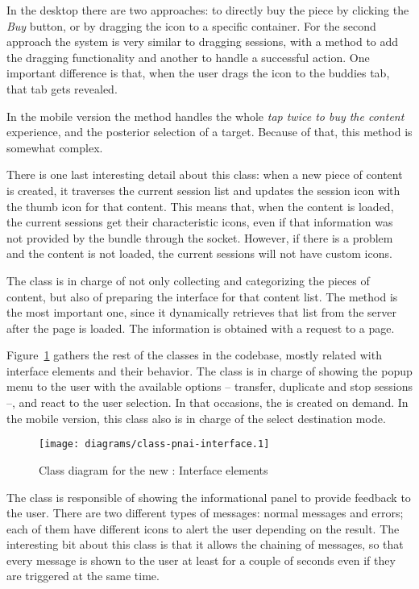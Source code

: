 In the desktop there are two approaches: to directly buy the piece by clicking the \emph{Buy} button, or by dragging the icon to a specific container.
For the second approach the system is very similar to dragging sessions, with a method to add the dragging functionality and another to handle a successful action.
One important difference is that, when the user drags the icon to the buddies tab, that tab gets revealed.

In the mobile version the  method handles the whole \emph{tap twice to buy the content} experience, and the posterior selection of a target.
Because of that, this method is somewhat complex.

There is one last interesting detail about this class: when a new piece of content is created, it traverses the current session list and updates the session icon with the thumb icon for that content.
This means that, when the content is loaded, the current sessions get their characteristic icons, even if that information was not provided by the  bundle through the socket.
However, if there is a problem and the content is not loaded, the current sessions will not have custom icons.

The  class is in charge of not only collecting and categorizing the pieces of content, but also of preparing the interface for that content list.
The  method is the most important one, since it dynamically retrieves that list from the server after the page is loaded.
The information is obtained with a  request to a  page.

Figure~\ref{fig:class-pnai-interface} gathers the rest of the classes in the  codebase, mostly related with interface elements and their behavior.
The  class is in charge of showing the popup menu to the user with the available options -- transfer, duplicate and stop sessions --, and react to the user selection.
In that occasions, the  is created on demand.
In the mobile version, this class also is in charge of the select destination mode.

\begin{figure}[htbp]
  \centering
    \texttt{[image: diagrams/class-pnai-interface.1]}
  \caption{Class diagram for the new : Interface elements}
  \label{fig:class-pnai-interface}
\end{figure}

The  class is responsible of showing the informational panel to provide feedback to the user.
There are two different types of messages: normal messages and errors; each of them have different icons to alert the user depending on the result.
The interesting bit about this class is that it allows the chaining of messages, so that every message is shown to the user at least for a couple of seconds even if they are triggered at the same time.

